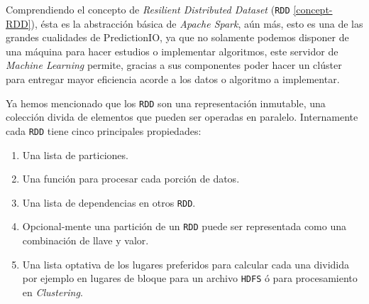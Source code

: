 

  Comprendiendo el concepto de \emph{Resilient Distributed Dataset} (\texttt{RDD} \ref{concept-RDD}), ésta es la abstracción básica de \emph{Apache Spark}, aún más, esto es una de las grandes cualidades de PredictionIO, ya que no solamente podemos disponer de una máquina para hacer estudios o implementar algoritmos, este servidor de \emph{Machine Learning} permite, gracias a sus componentes poder hacer un clúster para entregar mayor eficiencia acorde a los datos o algoritmo a implementar.

  Ya hemos mencionado que los \texttt{RDD} son una representación inmutable, una colección divida de elementos que pueden ser operadas en paralelo. Internamente cada \texttt{RDD} tiene cinco principales propiedades:


  \begin{enumerate}
  	\menorEspacioItemize
    \item Una lista de particiones.
    \item Una función para procesar cada porción de datos.
    \item Una lista de dependencias en otros \texttt{RDD}. 
    \item Opcional-mente una partición de un \texttt{RDD} puede ser representada como una combinación de llave y valor. 
    \item Una lista optativa de los lugares preferidos para calcular cada una dividida por ejemplo en lugares de bloque para un archivo \texttt{HDFS} ó para procesamiento en \emph{Clustering}.
  \end{enumerate}
